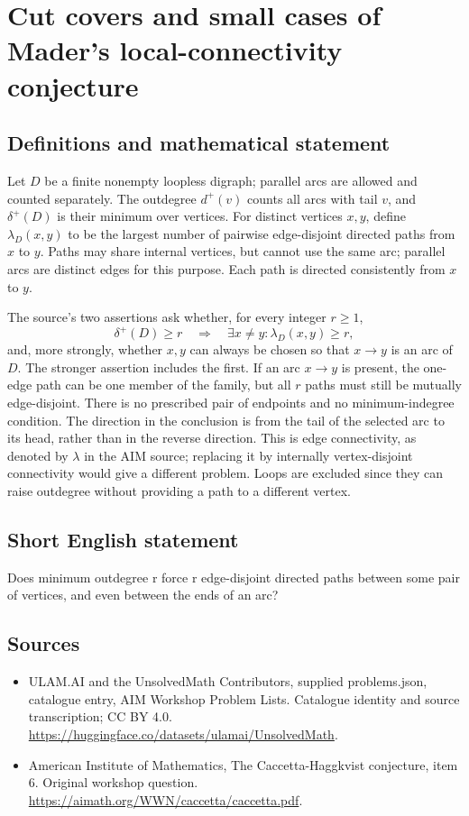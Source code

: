 \documentclass[11pt,a4paper]{article}
\begin{document}
\section*{Cut covers and small cases of Mader's local-connectivity conjecture}\label{statement}

\subsection{Definitions and mathematical statement}
Let $D$ be a finite nonempty loopless digraph; parallel arcs are
allowed and counted separately. The outdegree $d^+(v)$ counts all
arcs with tail $v$, and $\delta^+(D)$ is their minimum over vertices.
For distinct vertices $x,y$, define $\lambda_D(x,y)$ to be the
largest number of pairwise edge-disjoint directed paths from $x$
to $y$. Paths may share internal vertices, but cannot use the same
arc; parallel arcs are distinct edges for this purpose. Each path
is directed consistently from $x$ to $y$.

The source's two assertions ask whether, for every integer $r\ge1$,
\[
 \delta^+(D)\ge r\quad\Longrightarrow\quad
 \exists x\ne y:\lambda_D(x,y)\ge r,
\]
and, more strongly, whether $x,y$ can always be chosen so that
$x\to y$ is an arc of $D$. The stronger assertion includes the first.
If an arc $x\to y$ is present, the one-edge path can be one member
of the family, but all $r$ paths must still be mutually edge-disjoint.
There is no prescribed pair of endpoints and no minimum-indegree
condition.
The direction in the conclusion is from the tail of the selected arc
to its head, rather than in the reverse direction. This is edge
connectivity, as denoted by $\lambda$ in the AIM source; replacing it
by internally vertex-disjoint connectivity would give a different
problem. Loops are excluded since they can raise outdegree without
providing a path to a different vertex.
\subsection{Short English statement}
Does minimum outdegree r force r edge-disjoint directed paths between some pair of vertices, and even between the ends of an arc?
\subsection{Sources}
\begin{itemize}
\item[S1] ULAM.AI and the UnsolvedMath Contributors, supplied problems.json, catalogue entry, AIM Workshop Problem Lists. Catalogue identity and source transcription; CC BY 4.0.
\url{https://huggingface.co/datasets/ulamai/UnsolvedMath}.
\item[S2] American Institute of Mathematics, The Caccetta-Haggkvist conjecture, item 6. Original workshop question.
\url{https://aimath.org/WWN/caccetta/caccetta.pdf}.
\end{itemize}
\end{document}

